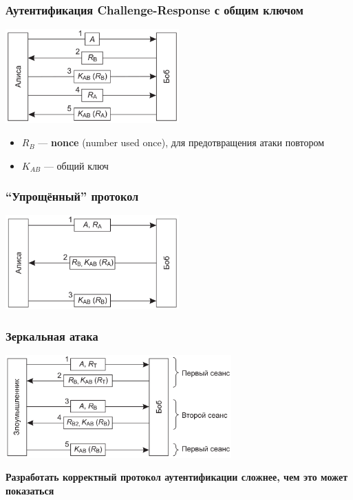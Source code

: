 \documentclass{../../slides-style}
\begin{document}
    \begin{frame}
        \frametitle{Аутентификация Challenge-Response с общим ключом}
        \begin{center}
            \includegraphics[width=0.5\textwidth]{challengeResponse.png}
        \end{center}
        \begin{itemize}
            \item $R_B$ --- \textbf{nonce} (number used once), для предотвращения атаки повтором
            \item $K_{AB}$ --- общий ключ
        \end{itemize}
    \end{frame}

    \begin{frame}
        \frametitle{``Упрощённый'' протокол}
        \begin{center}
            \includegraphics[width=0.5\textwidth]{simpleChallengeResponse.png}
        \end{center}
    \end{frame}

    \begin{frame}
        \frametitle{Зеркальная атака}
        \begin{center}
            \includegraphics[width=0.65\textwidth]{mirrorAttack.png}
        \end{center}
        \vspace{5mm}
        \textbf{Разработать корректный протокол аутентификации сложнее, чем это может показаться}
    \end{frame}
\end{document}
